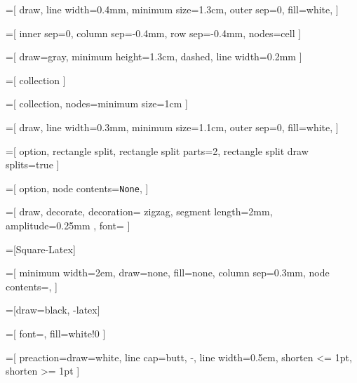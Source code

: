 \newcommand{\true}{\textcolor{green}{\ding{51}}}
\newcommand{\false}{\textcolor{red}{\ding{55}}}

\newcommand{\trueseq}{\tiny \true \, \true \, \true}
\newcommand{\falseseq}{\tiny \false \, \false \, \false}

=[
  draw,
  line width=0.4mm,
  minimum size=1.3cm,
  outer sep=0,
  fill=white,
]

=[
  inner sep=0,
  column sep=-0.4mm,
  row sep=-0.4mm,
  nodes=cell
]

=[
  draw=gray,
  minimum height=1.3cm,
  dashed,
  line width=0.2mm
]

=[
  collection
]

=[
  collection,
  nodes={minimum size=1cm}
]

=[
  draw,
  line width=0.3mm,
  minimum size=1.1cm,
  outer sep=0,
  fill=white,
]

=[
  option,
  rectangle split,
  rectangle split parts=2,
  rectangle split draw splits=true
]

\newcommand{\some}[1] {
  \small \texttt{Some} \nodepart{two} $b_i$
}

=[
  option,
  node contents={\small \texttt{None}},
]

=[
  draw,
  decorate,
  decoration={
    zigzag,
    segment length=2mm,
    amplitude=0.25mm
  },
  font=\ttfamily
]

=[Square-Latex]


\newcommand{\ellipsis}[1][15mm]{ \node [ellipsis=#1]; }
\newcommand{\vellipsis}[1][15mm]{ \node [vertical ellipsis=#1]; }

=[
  minimum width=2em,
  draw=none,
  fill=none,
  column sep=0.3mm,
  node contents={,}
]

\newcommand{\tuplecomma}{ \node [tuple comma]; }

=[draw=black, -latex]

=[
  font=\small,
  fill=white!0
]

=[
  preaction={draw=white, line cap=butt, -, line width=0.5em},
  shorten <= 1pt,
  shorten >= 1pt
]

